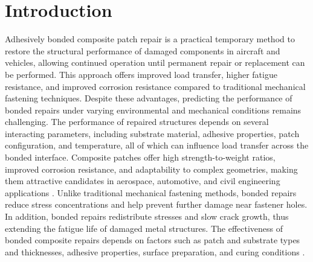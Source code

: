 \documentclass[journal,article,submit,pdftex,moreauthors]{Definitions/mdpi}
\begin{document}
\section{Introduction}

Adhesively bonded composite patch repair is a practical temporary method to restore the structural performance of damaged components in aircraft and vehicles, allowing continued operation until permanent repair or replacement can be performed. This approach offers improved load transfer, higher fatigue resistance, and improved corrosion resistance compared to traditional mechanical fastening techniques. Despite these advantages, predicting the performance of bonded repairs under varying environmental and mechanical conditions remains challenging. The performance of repaired structures depends on several interacting parameters, including substrate material, adhesive properties, patch configuration, and temperature, all of which can influence load transfer across the bonded interface.
Composite patches offer high strength-to-weight ratios, improved corrosion resistance, and adaptability to complex geometries, making them attractive candidates in aerospace, automotive, and civil engineering applications \cite{Mohammadi,Schubbe,Tavakkolizadeh}. Unlike traditional mechanical fastening methods, bonded repairs reduce stress concentrations and help prevent further damage near fastener holes. In addition, bonded repairs redistribute stresses and slow crack growth, thus extending the fatigue life of damaged metal structures\cite{Rhys,JonesR}. The effectiveness of bonded composite repairs depends on factors such as patch and substrate types and thicknesses, adhesive properties, surface preparation, and curing conditions \cite{Repair}. 
\end{document}
